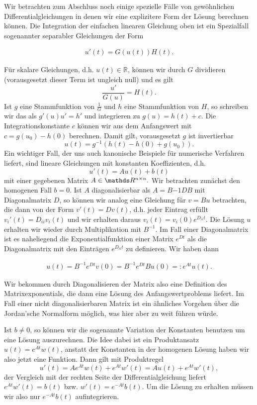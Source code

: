 Wir betrachten zum Abschluss noch einige spezielle Fälle von gewöhnlichen Differentialgleichungen in denen wir eine explizitere Form der Lösung berechnen können. Die Integration der einfachen linearen Gleichung oben ist ein Spezialfall sogenannter separabler Gleichungen der Form

\begin{align*}
u'(t) = G(u(t)) H(t).
\end{align*}

Für skalare Gleichungen, d.h. $u(t) \in \mathbb{R}$, können wir durch $G$ dividieren (vorausgesetzt dieser Term ist ungleich null) und es gilt 
$$ \frac{u'}{G(u)} = H(t). $$
Ist $g$ eine Stammfunktion von $\frac{1}G$ und $h$ eine Stammfunktion von $H$, so schreiben wir das als
$ g'(u) u' = h'$ und integrieren zu  $g(u) = h(t) + c$. Die Integrationskonstante $c$ können wir aus dem Anfangswert mit 
$c = g(u_0) - h(0)$ berechnen. 
Damit gilt, vorausgesetzt $g$ ist invertierbar
$$ u(t) = g^{-1} (h(t) - h(0) + g(u_0)). $$
%
Ein wichtiger Fall, der uns auch kanonische Beispiele für numerische Verfahren liefert, sind lineare Gleichungen mit konstanten Koeffizienten, d.h. 
$$ u'(t) = A u(t) + b(t) $$
mit einer gegebenen Matrix $A \in \R^{n \times n}.$ Wir betrachten zunächst den homogenen Fall $b=0$. Ist $A$ diagonalisierbar als $A = B{-1} D B$ mit Diagonalmatrix $D$, so können wir analog eine Gleichung für $v = B u$ betrachten, die dann von der Form
$v'(t) = D v(t)$, d.h. jeder Eintrag erfüllt $v_i'(t) = D_{ii} v_i(t)$ und wir erhalten daraus $v_i(t) = v_i(0) e^{D_{ii}t}.$
Die Lösung $u$ erhalten wir wieder durch Multiplikation mit $B^{-1}$. Im Fall einer Diagonalmatrix ist es naheliegend die Exponentialfunktion einer Matrix $e^{Dt}$ als die Diagonalmatrix mit den Einträgen $e^{D_{ii}t}$ zu definieren. Wir haben dann

\begin{align*}
u(t) = B^{-1} e^{Dt} v(0) =  B^{-1} e^{Dt} B u(0) =: e^{At} u(t).
\end{align*}

Wir bekommen durch Diagonalisieren der Matrix also eine Definition des Matrixexponentials, die dann eine Lösung des Anfangswertproblems liefert. Im Fall einer nicht diagonalisierbaren Matrix ist ein ähnliches Vorgehen über die Jordan'sche Normalform möglich, was hier aber zu weit führen würde.

Ist $b \neq 0$, so können wir die sogenannte Variation der Konstanten benutzen um eine Lösung auszurechnen. Die Idee dabei ist ein Produktansatz $u(t) = e^{At} w(t)$, anstatt der Konstanten in der homogenen Lösung haben wir also jetzt eine Funktion. Dann gilt mit Produktregel
$$ u'(t) = A e^{At} w(t) + e^{At}w'(t) = Au(t) + e^{At}w'(t), $$
der Vergleich mit der rechten Seite der Differentialgleichung liefert $e^{At} w'(t) = b(t)$ bzw. $w'(t) = e^{-At} b(t). $
Um die Lösung zu erhalten müssen wir also nur $e^{-At} b(t)$ aufintegrieren. 

